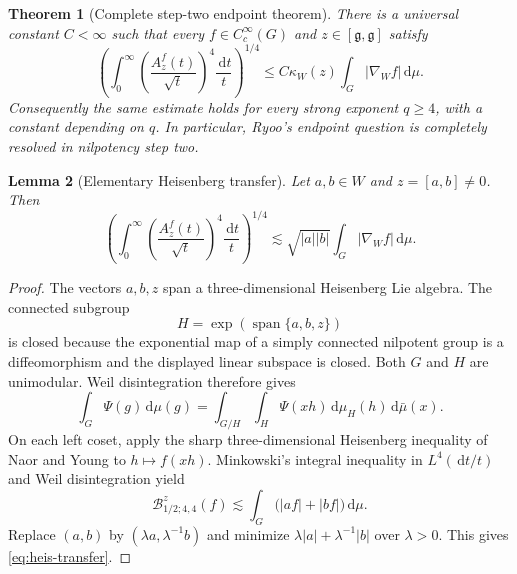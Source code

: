 \documentclass[11pt]{article}
\newtheorem{theorem}{Theorem}[section]
\newtheorem{lemma}[theorem]{Lemma}
\theoremstyle{definition}
\theoremstyle{remark}
\newcommand{\g}{\mathfrak g}
\newcommand{\dd}{\,\mathrm d}
\newcommand{\abs}[1]{\lvert #1\rvert}
\newcommand{\A}[2]{A_{#1}^{#2}}
\newcommand{\B}[4]{\mathcal B^{#1}_{#2;#3,#4}}
\newcommand{\less}{\lesssim}
\DeclareMathOperator{\spanop}{span}
\begin{document}
\begin{theorem}[Complete step-two endpoint theorem]\label{thm:step2}
There is a universal constant \(C<\infty\) such that every
\(f\in C_c^\infty(G)\) and \(z\in[\g,\g]\) satisfy
\begin{equation}\label{eq:step2q4}
 \left(\int_0^\infty
 \left(\frac{\A{z}{f}(t)}{\sqrt t}\right)^4\frac{\dd t}{t}
 \right)^{1/4}
 \le C\kappa_W(z)\int_G\abs{\nabla_Wf}\dd\mu.
\end{equation}
Consequently the same estimate holds for every strong exponent \(q\ge4\), with a
constant depending on \(q\).  In particular, Ryoo's endpoint question is completely
resolved in nilpotency step two.
\end{theorem}

\begin{lemma}[Elementary Heisenberg transfer]\label{lem:heis-transfer}
Let \(a,b\in W\) and \(z=[a,b]\ne0\).  Then
\begin{equation}\label{eq:heis-transfer}
 \left(\int_0^\infty
 \left(\frac{\A{z}{f}(t)}{\sqrt t}\right)^4\frac{\dd t}{t}
 \right)^{1/4}
 \less \sqrt{\abs a\abs b}\int_G\abs{\nabla_Wf}\dd\mu.
\end{equation}
\end{lemma}

\begin{proof}
The vectors \(a,b,z\) span a three-dimensional Heisenberg Lie algebra.  The connected
subgroup
\[
 H=\exp(\spanop\{a,b,z\})
\]
is closed because the exponential map of a simply connected nilpotent group is a
diffeomorphism and the displayed linear subspace is closed.  Both \(G\) and \(H\) are
unimodular.  Weil disintegration therefore gives
\[
 \int_G\Psi(g)\dd\mu(g)=\int_{G/H}\int_H\Psi(xh)\dd\mu_H(h)\dd\bar\mu(x).
\]
On each left coset, apply the sharp three-dimensional Heisenberg inequality of Naor and
Young \cite{NaorYoung2022} to \(h\mapsto f(xh)\).  Minkowski's integral inequality in
\(L^4(\dd t/t)\) and Weil disintegration yield
\[
 \B{z}{1/2}{4}{4}(f)
 \less\int_G\bigl(\abs{af}+\abs{bf}\bigr)\dd\mu.
\]
Replace \((a,b)\) by \((\lambda a,\lambda^{-1}b)\) and minimize
\(\lambda\abs a+\lambda^{-1}\abs b\) over \(\lambda>0\).  This gives
\eqref{eq:heis-transfer}.
\end{proof}
\end{document}

